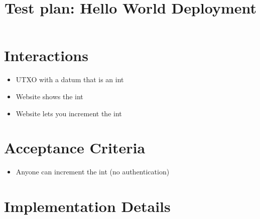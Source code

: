\documentclass{article}
\title{Test plan: Hello World Deployment}
\begin{document}
\maketitle

\section{Interactions}

\begin{itemize}
  \item UTXO with a datum that is an int
  \item Website shows the int
  \item Website lets you increment the int
\end{itemize}

\section{Acceptance Criteria}

\begin{itemize}
  \item Anyone can increment the int (no authentication)
\end{itemize}

\section{Implementation Details}
\end{document}

